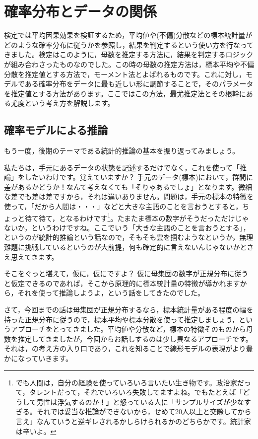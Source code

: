 \documentclass{ltjsbook}
\begin{document}
\chapter{確率分布とデータの関係}
\label{m23_likelihood}
検定では平均因果効果を検証するため，平均値や(不偏)分散などの標本統計量がどのような確率分布に従うかを参照し，結果を判定するという使い方を行なってきました。検定はこのように，母数を推定する方法に，結果を判定するロジックが組み合わさったものなのでした。この時の母数の推定方法は，標本平均や不偏分散を推定値とする方法で，モーメント法とよばれるものです。これに対し，モデルである確率分布をデータに最も近しい形に調節することで，そのパラメータを推定値とする方法があります。ここではこの方法，最尤推定法とその根幹にある尤度という考え方を解説します。
\section{確率モデルによる推論}
もう一度，後期のテーマである統計的推論の基本を振り返ってみましょう。

私たちは，手元にあるデータの状態を記述するだけでなく，これを使って「推論」をしたいわけです。覚えていますか？ 手元のデータ(標本)において，群間に差があるかどうか！なんて考えなくても「そりゃあるでしょ」となります。微細な差でも差は差ですから，それは違いありません。問題は，手元の標本の特徴を使って，「だから人間は・・・」などと大きな主語のことを言おうとすると，ちょっと待て待て，となるわけです\footnote{でも人間は，自分の経験を使っていろいろ言いたい生き物です。政治家だって，タレントだって，それでいろいろ失敗してますよね。でもたとえば「どうして男性は浮気するのか！」と怒っている人に「サンプルサイズが少なすぎる。それでは妥当な推論ができないから，せめて20人以上と交際してから言え」なんていうと逆ギレされるかしらけられるかのどちらかです。統計家は辛いよ。}。たまたま標本の数字がそうだっただけじゃないか，というわけですね。ここでいう「大きな主語のことを言おうとする」，というのが統計的推論という話なので，そもそも雲を掴むようなというか，無理難題に挑戦しているというのが大前提，何も確定的に言えないんじゃないかとさえ思えてきます。

そこをぐっと堪えて，仮に，仮にですよ？ 仮に母集団の数字が正規分布に従うと仮定できるのであれば，そこから原理的に標本統計量の特徴が導かれますから，それを使って推論しようよ，という話をしてきたのでした。

さて，今回までの話は母集団が正規分布するなら，標本統計量がある程度の幅を持った正規分布に従うので，標本平均や標本分散を使って推定しましょう，というアプローチをとってきました。平均値や分散など，標本の特徴そのものから母数を推定してきましたが，今回からお話しするのは少し異なるアプローチです。それは，の考え方の入り口であり，これを知ることで線形モデルの表現がより豊かになっていきます。
\end{document}
